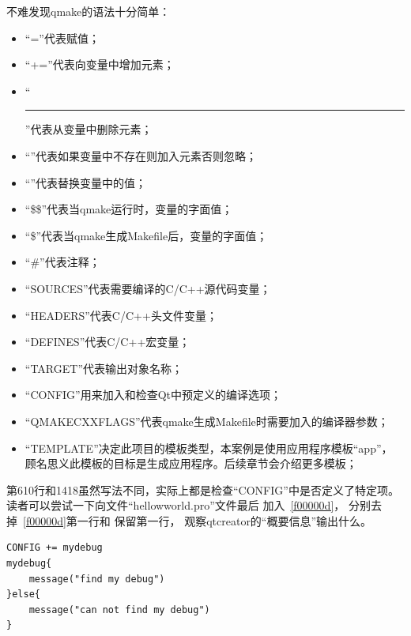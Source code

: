 不难发现qmake的语法十分简单：
\begin{itemize}
\item “{\sourcefonttwo{}=}”代表赋值；
\item “{\sourcefonttwo{}+}{\sourcefonttwo{}=}”代表向变量中增加元素；
\item “\hspace{0.05em}\rule[0.7ex]{0.4em}{0.65pt}\hspace{0.05em}{\sourcefonttwo{}=}”代表从变量中删除元素；
\item “\raisebox{-0.35ex}{\sourcefonttwo{}*}{\sourcefonttwo{}=}”代表如果变量中不存在则加入元素否则忽略；
\item “\raisebox{0.16ex}{\sourcefonttwo\~{}}{\sourcefonttwo{}=}”代表替换变量中的值；
\item “{\sourcefonttwo\$}{\sourcefonttwo\$}”代表当qmake运行时，变量的字面值；
\item “{\sourcefonttwo\$}”代表当qmake生成Makefile后，变量的字面值；
\item “{\sourcefonttwo\#}”代表注释；
\item “SOURCES”代表需要编译的C/C{\sourcefonttwo{}+}{\sourcefonttwo{}+}源代码变量；
\item “HEADERS”代表C/C{\sourcefonttwo{}+}{\sourcefonttwo{}+}头文件变量；
\item “DEFINES”代表C/C{\sourcefonttwo{}+}{\sourcefonttwo{}+}宏变量；
\item “TARGET”代表输出对象名称；
\item “CONFIG”用来加入和检查Qt中预定义的编译选项；
\item “QMAKE\underline{\hspace{0.5em}}CXXFLAGS”代表qmake生成Makefile时需要加入的编译器参数；
\item “TEMPLATE”决定此项目的模板类型，本案例是使用应用程序模板“app”，
顾名思义此模板的目标是生成应用程序。后续章节会介绍更多模板；
\end{itemize}

第6\raisebox{0.16ex}{\sourcefonttwo\~{}}10行和14\raisebox{0.16ex}{\sourcefonttwo\~{}}18虽然写法不同，实际上都是检查“CONFIG”中是否定义了特定项。
读者可以尝试一下向文件“hellow\underline{\hspace{0.5em}}world.pro”文件最后
加入\lstlistingname\ \ref{f00000d}，
分别去掉\lstlistingname\ \ref{f00000d}第一行和
保留第一行，
观察qtcreator的“概要信息”输出什么。
\begin{lstlisting}[label=f00000d,
caption=GoodLuck,
title=\lstlistingname\ \thelstlisting
]
CONFIG += mydebug
mydebug{
    message("find my debug")
}else{
    message("can not find my debug")
}
\end{lstlisting}          %




